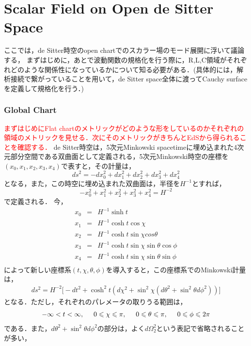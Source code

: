 \section{Scalar Field on Open de Sitter Space}
ここでは，de Sitter時空のopen chartでのスカラー場のモード展開に浮いて議論する，
まずはじめに，あとで波動関数の規格化を行う際に，R,L,C領域がそれぞれどのような関係性になっているかについて知る必要がある．(具体的には，解析接続で繋がっていることを用いて，de Sitter space全体に渡ってCauchy surfaceを定義して規格化を行う．)
\subsubsection{Global Chart}
\textcolor{red}{まずはじめにFlat chartのメトリックがどのような形をしているのかそれぞれの領域のメトリックを見せる．次にそのメトリックがきちんとEdSから得られることを確認する．}
de Sitter時空は，5次元Minkowski spacetimeに埋め込まれた4次元部分空間である双曲面として定義される，5次元Minkowski時空の座標を$(x_0,x_1,x_2,x_3,x_4)$で表すと，その計量は，
\begin{equation}
  ds^2=-dx_0^2+dx_1^2+dx_2^2+dx_3^2+dx_4^2
\end{equation}
となる，また，この時空に埋め込まれた双曲面は，半径を$H^{-1}$とすれば，
\begin{equation}
  \label{1.2}
  -x_0^2+x_1^2+x_2^2+x_3^2+x_4^2=H^{-2}
\end{equation}
で定義される．
今，
\begin{eqnarray}
  x_0&=&H^{-1}\sinh{t} \\
  x_1&=&H^{-1}\cosh{t}\cos{\chi} \\
  x_2&=&H^{-1}\cosh{t}\sin{\chi}cos{\theta} \\
  x_3&=&H^{-1}\cosh{t}\sin{\chi}\sin{\theta}\cos{\phi} \\
  x_4&=&H^{-1}\cosh{t}\sin{\chi}\sin{\theta}\sin{\phi} \\
\end{eqnarray}
によって新しい座標系$(t,\chi,\theta,\phi)$を導入すると，この座標系でのMinkowski計量は，
\begin{eqnarray}
  ds^2=H^{-2}\biggr[-dt^2+\cosh^2{t}(d\chi^2+\sin^2\chi(d\theta^2+\sin^2\theta d\phi^2))\biggr]
\end{eqnarray}
となる．ただし，それぞれのパレメータの取りうる範囲は，
\begin{eqnarray}
  -\infty< t < \infty,\hspace{0.5cm} 0 \leqslant \chi \leqslant \pi,\hspace{0.5cm} 0 \leqslant \theta \leqslant \pi, \hspace{0.5cm} 0 \leqslant \phi \leqslant 2\pi
\end{eqnarray}である．また，$d\theta^2+\sin^2\theta d\phi^2$の部分は，よく$d\Omega_2^2$という表記で省略されることが多い，
